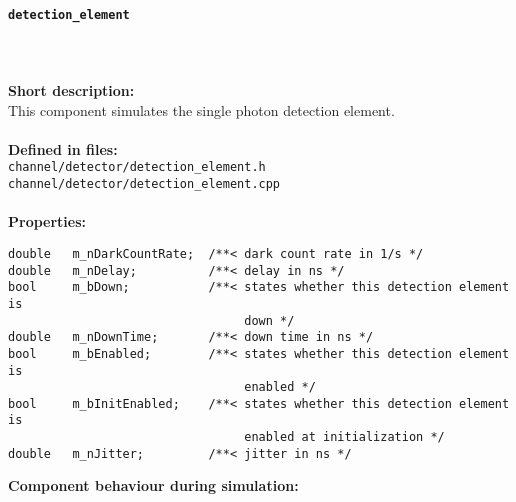\paragraph{\texttt{detection\_element}}
\label{par:comp_detector_detelem}
\noindent \\
\\
\textbf{Short description:}\\
This component simulates the single photon detection element.\\
\\
\textbf{Defined in files:}\\
\texttt{channel/detector/detection\_element.h}\\
\texttt{channel/detector/detection\_element.cpp}\\
\\
\textbf{Properties:}
\begin{lstlisting}
double   m_nDarkCountRate;  /**< dark count rate in 1/s */
double   m_nDelay;          /**< delay in ns */
bool     m_bDown;           /**< states whether this detection element is
                                 down */
double   m_nDownTime;       /**< down time in ns */
bool     m_bEnabled;        /**< states whether this detection element is
                                 enabled */
bool     m_bInitEnabled;    /**< states whether this detection element is
                                 enabled at initialization */
double   m_nJitter;         /**< jitter in ns */
\end{lstlisting}
\noindent
\textbf{Component behaviour during simulation:}
